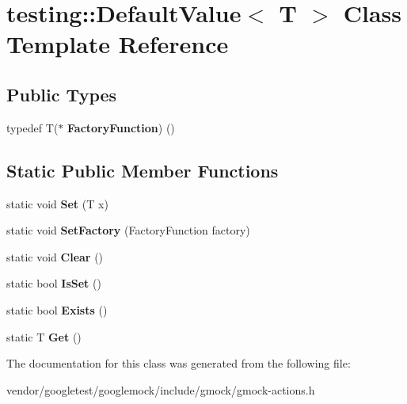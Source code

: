 \hypertarget{classtesting_1_1_default_value}{}\section{testing\+:\+:Default\+Value$<$ T $>$ Class Template Reference}
\label{classtesting_1_1_default_value}
\subsection*{Public Types}
\begin{DoxyCompactItemize}
\item 
\mbox{\label{classtesting_1_1_default_value_a5763a68d75e0a4c97fcaff708e2df803}} 
typedef T($\ast$ {\bfseries Factory\+Function}) ()
\end{DoxyCompactItemize}
\subsection*{Static Public Member Functions}
\begin{DoxyCompactItemize}
\item 
\mbox{\label{classtesting_1_1_default_value_a5698814be364b9ac26e72ad37d6ff14e}} 
static void {\bfseries Set} (T x)
\item 
\mbox{\label{classtesting_1_1_default_value_af012445ff5b194940c1427529707cb91}} 
static void {\bfseries Set\+Factory} (Factory\+Function factory)
\item 
\mbox{\label{classtesting_1_1_default_value_a8163037b60311177cb211f070c512ee3}} 
static void {\bfseries Clear} ()
\item 
\mbox{\label{classtesting_1_1_default_value_ad49febe2c944cbbd06451ba7d0366ca1}} 
static bool {\bfseries Is\+Set} ()
\item 
\mbox{\label{classtesting_1_1_default_value_aec1ff9b510af7dbb86c837fd2409fd70}} 
static bool {\bfseries Exists} ()
\item 
\mbox{\label{classtesting_1_1_default_value_a4dc6dfee4cbc9cdb36f5c9cde5cf2b83}} 
static T {\bfseries Get} ()
\end{DoxyCompactItemize}


The documentation for this class was generated from the following file\+:\begin{DoxyCompactItemize}
\item 
vendor/googletest/googlemock/include/gmock/gmock-\/actions.\+h\end{DoxyCompactItemize}
